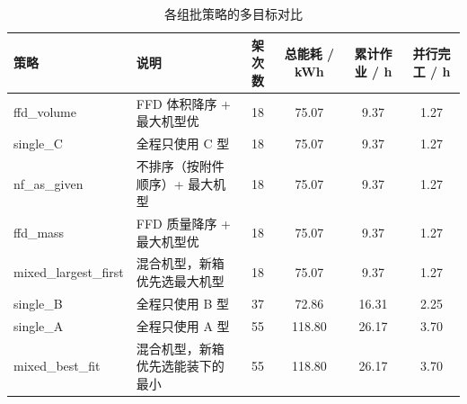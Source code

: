 \begin{table}[htbp]
\caption{各组批策略的多目标对比}
\label{tab:q1_strategy}
\centering
{}
\setlength{\tabcolsep}{4pt}
\begin{tabular}{llcccc}
\toprule
策略 & 说明 & 架次数 & 总能耗 / kWh & 累计作业 / h & 并行完工 / h \\
\midrule
ffd\_volume & FFD 体积降序 + 最大机型优 & 18 & 75.07 & 9.37 & 1.27 \\
single\_C & 全程只使用 C 型 & 18 & 75.07 & 9.37 & 1.27 \\
nf\_as\_given & 不排序（按附件顺序）+ 最大机型 & 18 & 75.07 & 9.37 & 1.27 \\
ffd\_mass & FFD 质量降序 + 最大机型优 & 18 & 75.07 & 9.37 & 1.27 \\
mixed\_largest\_first & 混合机型，新箱优先选最大机型 & 18 & 75.07 & 9.37 & 1.27 \\
single\_B & 全程只使用 B 型 & 37 & 72.86 & 16.31 & 2.25 \\
single\_A & 全程只使用 A 型 & 55 & 118.80 & 26.17 & 3.70 \\
mixed\_best\_fit & 混合机型，新箱优先选能装下的最小 & 55 & 118.80 & 26.17 & 3.70 \\
\bottomrule
\end{tabular}
\end{table}
